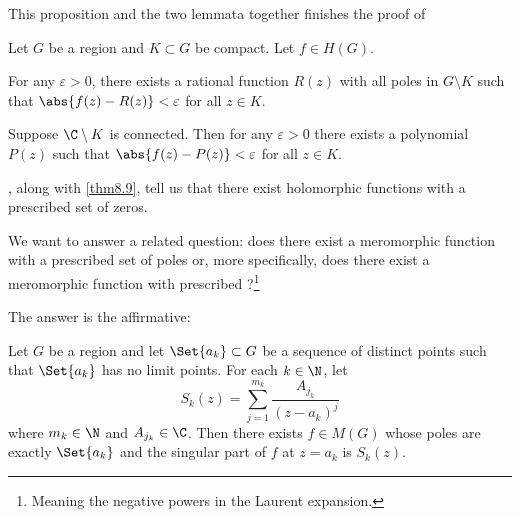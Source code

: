 This proposition and the two lemmata together finishes the proof of

\begin{theorem}\label{thm10.4}
	Let $G$ be a region and $K \subset G$ be compact.
	Let $f \in H(G)$.
	\begin{items}
		\item For any $\varepsilon > 0$, there exists a rational function $R(z)$ with all poles in $G \setminus K$ such that $\abs{f(z) - R(z)} < \varepsilon$ for all $z \in K$.
		\item Suppose $\C \setminus K$ is connected.
		Then for any $\varepsilon > 0$ there exists a polynomial $P(z)$ such that $\abs{f(z) - P(z)} < \varepsilon$ for all $z \in K$.
	\end{items}
\end{theorem}


, along with \autoref{thm8.9}, tell us that there exist holomorphic functions with a prescribed set of zeros.

We want to answer a related question: does there exist a meromorphic function with a prescribed set of poles or, more specifically, does there exist a meromorphic function with prescribed ?\footnote{Meaning the negative powers in the Laurent expansion.}

The answer is the affirmative:

\begin{theorem}\label{thm10.5}
	Let $G$ be a region and let $\Set{a_k} \subset G$ be a sequence of distinct points such that $\Set{a_k}$ has no limit points.
	For each $k \in \N$, let
	\[
		S_k(z) = \sum_{j = 1}^{m_k} \frac{A_{j_k}}{(z - a_k)^j}
	\]
	where $m_k \in \N$ and $A_{j_k} \in \C$.
	Then there exists $f \in M(G)$ whose poles are exactly $\Set{a_k}$ and the singular part of $f$ at $z = a_k$ is $S_k(z)$.
\end{theorem}

